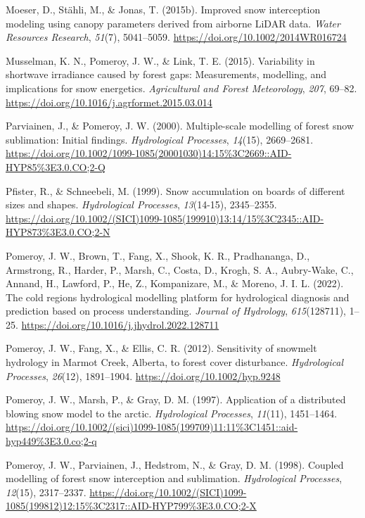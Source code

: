 \documentclass[
  letterpaper,
  DIV=11,
  numbers=noendperiod]{scrartcl}
\newlength{\cslhangindent}
\newenvironment{CSLReferences}[2] %
 {\begin{list}{}{%
  \setlength{\itemindent}{0pt}
  \setlength{\leftmargin}{0pt}
  \setlength{\parsep}{0pt}
  \ifodd #1
   \setlength{\leftmargin}{\cslhangindent}
   \setlength{\itemindent}{-1\cslhangindent}
  \fi
  \setlength{\itemsep}{#2\baselineskip}}}
 {\end{list}}
\begin{document}
\begin{CSLReferences}{1}{0}
Moeser, D., Stähli, M., \& Jonas, T. (2015b). Improved snow interception
modeling using canopy parameters derived from airborne {LiDAR} data.
\emph{Water Resources Research}, \emph{51}(7), 5041--5059.
\url{https://doi.org/10.1002/2014WR016724}

Musselman, K. N., Pomeroy, J. W., \& Link, T. E. (2015). Variability in
shortwave irradiance caused by forest gaps: {Measurements}, modelling,
and implications for snow energetics. \emph{Agricultural and Forest
Meteorology}, \emph{207}, 69--82.
\url{https://doi.org/10.1016/j.agrformet.2015.03.014}

Parviainen, J., \& Pomeroy, J. W. (2000). Multiple-scale modelling of
forest snow sublimation: {Initial} findings. \emph{Hydrological
Processes}, \emph{14}(15), 2669--2681.
\url{https://doi.org/10.1002/1099-1085(20001030)14:15\%3C2669::AID-HYP85\%3E3.0.CO;2-Q}

Pfister, R., \& Schneebeli, M. (1999). Snow accumulation on boards of
different sizes and shapes. \emph{Hydrological Processes},
\emph{13}(14-15), 2345--2355.
\url{https://doi.org/10.1002/(SICI)1099-1085(199910)13:14/15\%3C2345::AID-HYP873\%3E3.0.CO;2-N}

Pomeroy, J. W., Brown, T., Fang, X., Shook, K. R., Pradhananga, D.,
Armstrong, R., Harder, P., Marsh, C., Costa, D., Krogh, S. A.,
Aubry-Wake, C., Annand, H., Lawford, P., He, Z., Kompanizare, M., \&
Moreno, J. I. L. (2022). The cold regions hydrological modelling
platform for hydrological diagnosis and prediction based on process
understanding. \emph{Journal of Hydrology}, \emph{615}(128711), 1--25.
\url{https://doi.org/10.1016/j.jhydrol.2022.128711}

Pomeroy, J. W., Fang, X., \& Ellis, C. R. (2012). Sensitivity of
snowmelt hydrology in {Marmot Creek}, {Alberta}, to forest cover
disturbance. \emph{Hydrological Processes}, \emph{26}(12), 1891--1904.
\url{https://doi.org/10.1002/hyp.9248}

Pomeroy, J. W., Marsh, P., \& Gray, D. M. (1997). Application of a
distributed blowing snow model to the arctic. \emph{Hydrological
Processes}, \emph{11}(11), 1451--1464.
\url{https://doi.org/10.1002/(sici)1099-1085(199709)11:11\%3C1451::aid-hyp449\%3E3.0.co;2-q}

Pomeroy, J. W., Parviainen, J., Hedstrom, N., \& Gray, D. M. (1998).
Coupled modelling of forest snow interception and sublimation.
\emph{Hydrological Processes}, \emph{12}(15), 2317--2337.
\url{https://doi.org/10.1002/(SICI)1099-1085(199812)12:15\%3C2317::AID-HYP799\%3E3.0.CO;2-X}


\end{CSLReferences}
\end{document}
